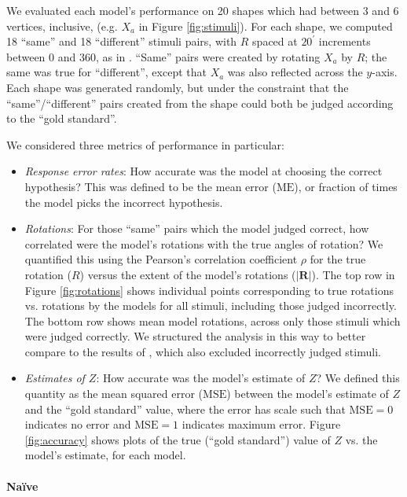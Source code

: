 \documentclass{article} %
\newcommand{\MSE}[0]{\mathrm{MSE}}
\newcommand{\ME}[0]{\mathrm{ME}}
\newcommand{\Naive}[0]{Na\"ive}
\begin{document}
We evaluated each model's performance on 20 shapes which had between 3
and 6 vertices, inclusive, (e.g. $X_a$ in Figure
\ref{fig:stimuli}). For each shape, we computed 18 ``same'' and 18
``different'' stimuli pairs, with $R$ spaced at $20^\prime$ increments
between 0 and 360, as in \cite{Shepard1971}. ``Same'' pairs were
created by rotating $X_a$ by $R$; the same was true for ``different'',
except that $X_a$ was also reflected across the $y$-axis. Each shape
was generated randomly, but under the constraint that the
``same''/``different'' pairs created from the shape could both be
judged according to the ``gold standard''.

We considered three metrics of performance in particular:
\begin{itemize}
\item \textit{Response error rates}: How accurate was the model at
  choosing the correct hypothesis? This was defined to be the mean
  error ($\ME{}$), or fraction of times the model picks the incorrect
  hypothesis.
\item \textit{Rotations}: For those ``same'' pairs which the model
  judged correct, how correlated were the model's rotations with the
  true angles of rotation?  We quantified this using the Pearson's
  correlation coefficient $\rho$ for the true rotation ($R$) versus
  the extent of the model's rotations ($\vert \mathbf{R}\vert$). The
  top row in Figure \ref{fig:rotations} shows individual points
  corresponding to true rotations vs. rotations by the models for all
  stimuli, including those judged incorrectly. The bottom row shows
  mean model rotations, across only those stimuli which were judged
  correctly. We structured the analysis in this way to better compare
  to the results of \cite{Shepard1971}, which also excluded
  incorrectly judged stimuli.
\item \textit{Estimates of $Z$}: How accurate was the model's estimate
  of $Z$? We defined this quantity as the mean squared error
  ($\MSE{}$) between the model's estimate of $Z$ and the ``gold
  standard'' value, where the error has scale such that $\MSE{}=0$
  indicates no error and $\MSE{}=1$ indicates maximum error. Figure
  \ref{fig:accuracy} shows plots of the true (``gold standard'') value
  of $Z$ vs. the model's estimate, for each model.
\end{itemize}

\paragraph{\Naive{}} 
\end{document}
